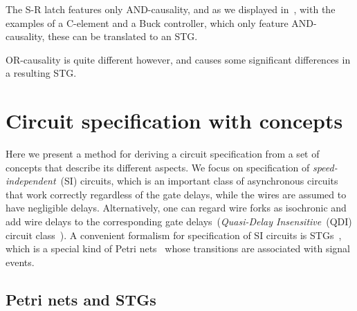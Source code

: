 \documentclass[british, journal]{IEEEtran}
\begin{document}
The S-R latch features only AND-causality, and as we displayed 
in~\cite{2015_Beaumont_MEMOCODE}, with the examples of a C-element 
and a Buck controller, which only feature AND-causality, these can be translated
to an STG. 

OR-causality is quite different however, and causes some significant differences 
in a resulting STG. 

\section{Circuit specification with concepts \label{sec:Circuit-specification-with}}


Here we present a method for deriving a circuit specification
from a set of concepts that describe its different aspects. We focus
on specification of \emph{speed-independent}~(SI) circuits, which
is an important class of asynchronous circuits~\cite{Muller_1959_ts}
that work correctly regardless of the gate delays, while the wires
are assumed to have negligible delays. Alternatively, one can regard
wire forks as isochronic and add wire delays to the corresponding
gate delays~(\emph{Quasi-Delay Insensitive}~(QDI) circuit
class~\cite{Martin_1986_dc}).
A convenient formalism for specification of SI circuits is
STGs~\cite{Chu_1987_phd}\cite{Rosenblum_1985_tpn},
which is a special kind of Petri nets~\cite{Petri_1962_phd} whose
transitions are associated with signal events.

\vspace{-1mm}
\subsection{Petri nets and STGs}
\end{document}
